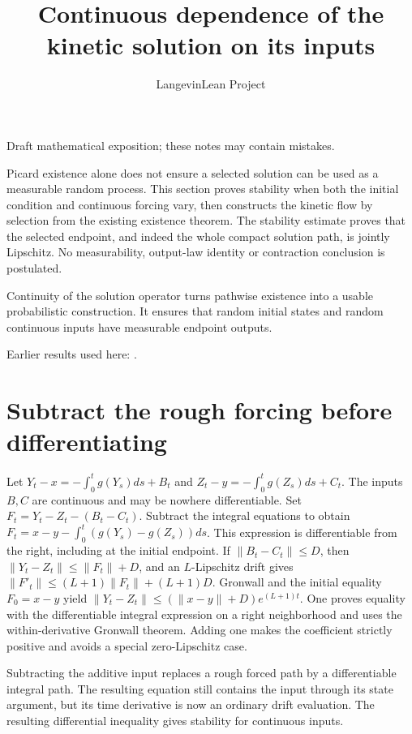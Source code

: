 \documentclass[11pt,a4paper]{article}
\title{\texorpdfstring{Continuous dependence of the kinetic solution on its inputs}{Continuous dependence of the kinetic solution on its inputs}}
\author{LangevinLean Project}
\date{}
\begin{document}
\maketitle
Draft mathematical exposition; these notes may contain mistakes.


Picard existence alone does not ensure a selected solution can be used as a measurable random process. This section proves stability when both the initial condition and continuous forcing vary, then constructs the kinetic flow by selection from the existing existence theorem. The stability estimate proves that the selected endpoint, and indeed the whole compact solution path, is jointly Lipschitz. No measurability, output-law identity or contraction conclusion is postulated.



Continuity of the solution operator turns pathwise existence into a usable probabilistic construction. It ensures that random initial states and random continuous inputs have measurable endpoint outputs.



Earlier results used here: \cite[Section~3.43]{LangevinLean2026ULASC}.

\section{\texorpdfstring{Subtract the rough forcing before differentiating}{Subtract the rough forcing before differentiating}}


Let \(Y_t-x=-\int_0^tg(Y_s)ds+B_t\) and \(Z_t-y=-\int_0^tg(Z_s)ds+C_t\). The inputs \(B,C\) are continuous and may be nowhere differentiable. Set \(F_t=Y_t-Z_t-(B_t-C_t)\). Subtract the integral equations to obtain \(F_t=x-y-\int_0^t(g(Y_s)-g(Z_s))ds\). This expression is differentiable from the right, including at the initial endpoint. If \(\|B_t-C_t\|\le D\), then \(\|Y_t-Z_t\|\le\|F_t\|+D\), and an \(L\)-Lipschitz drift gives \(\|F'_t\|\le(L+1)\|F_t\|+(L+1)D\). Gronwall and the initial equality \(F_0=x-y\) yield \(\|Y_t-Z_t\|\le(\|x-y\|+D)e^{(L+1)t}\). One proves equality with the differentiable integral expression on a right neighborhood and uses the within-derivative Gronwall theorem. Adding one makes the coefficient strictly positive and avoids a special zero-Lipschitz case.



Subtracting the additive input replaces a rough forced path by a differentiable integral path. The resulting equation still contains the input through its state argument, but its time derivative is now an ordinary drift evaluation. The resulting differential inequality gives stability for continuous inputs.
\end{document}
